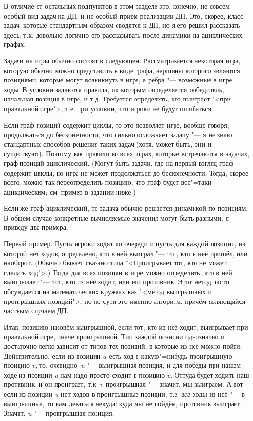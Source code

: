  В отличие от остальных подпунктов в этом разделе это, конечно, не совсем особый вид
задач на ДП, и не особый приём реализации ДП. Это, скорее, класс задач, которые стандартным образом сводятся
к ДП, но я его решил рассказать здесь, т.к. довольно логично его рассказывать после динамики на ациклических графах.

Задачи на игры обычно состоят в следующем. Рассматривается некоторая игра, которую обычно можно представить в виде
графа, вершины которого являются позициями, которые могут возникнуть в игре, а ребра "--- возможные в игре ходы. 
В условии задаются правила, по которым определяется победитель, начальная позиция в игре, и т.д.
Требуется определить, кто выиграет "<при правильной игре">, т.е. при условии, что игроки не будут
ошибаться.

Если граф позиций содержит циклы, то это позволяет игре, вообще говоря, продолжаться до бесконечности, что сильно осложняет задачу
"--- я не знаю стандартных способов решения таких задач (хотя, может быть, они и существуют). Поэтому
как правило во всех играх, которые встречаются в задачах, граф позиций ациклический. (Могут быть задачи,
где на первый взгляд граф содержит циклы, но игра не может продолжаться до бесконечности. Тогда, скорее всего,
можно так переопределить позицию, что граф будет все"=таки ациклическим; см. пример в задании ниже.)

Если же граф ациклический, то задача обычно решается динамикой по позициям. В общем случае конкретные вычисляемые значения
могут быть разными, я приведу два примера.

Первый пример. Пусть игроки ходят по очереди и пусть для каждой позиции, из которой нет ходов, определено, кто в ней выиграл "--- тот, кто в неё пришёл,
или наоборот. (Обычно бывает сказано типа "<Проигрывает тот, кто не может сделать ход">.) Тогда для всех 
позиции в игре можно определить, кто в ней выигрывает "--- тот, кто из неё ходит, или его противник. Этот метод
часто обсуждается на математических кружках как "<метод выигрышных и проигрышных позиций">, но по сути это именно алгоритм,
причём являющийся частным случаем ДП.

Итак, позицию назовём выигрышной, если тот, кто из неё ходит, выигрывает при правильной игре, иначе проигрышной. Тип каждой
позиции однозначно и достаточно легко зависит от типов тех позиций, в которые из неё можно пойти. Действительно, если
из позиции $u$ есть ход в какую"=нибудь проигрышную позицию $v$, то, очевидно, $u$ "--- выигрышная позиция,
и для победы при нашем ходе из позиции $u$ нам надо просто сходит в позицию $v$. Оттуда будет ходить наш противник,
и он проиграет, т.к. $v$ проигрышная "--- значит, мы выиграем. А вот если из позиции $u$ нет ходов в проигрышные позиции,
т.е. \textit{все} ходы из неё "--- в выигрышные, то нам деваться некуда: куда мы не пойдём, противник выиграет. Значит, $u$ "---
проигрышная позиция. 

